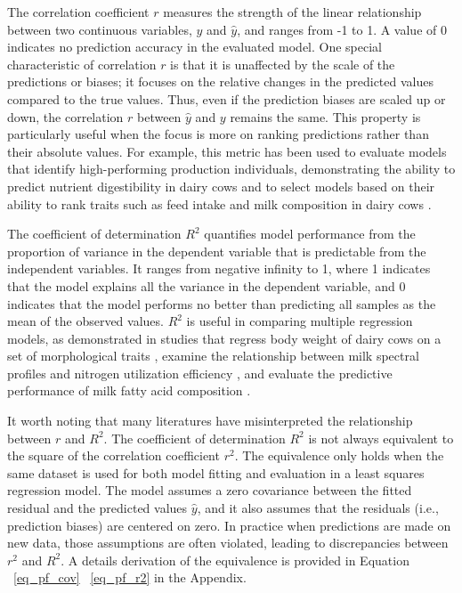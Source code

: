 The correlation coefficient \(r\) measures the strength of the linear relationship between two continuous variables, \(y\) and \(\hat{y}\), and ranges from -1 to 1. A value of 0 indicates no prediction accuracy in the evaluated model. One special characteristic of correlation \(r\) is that it is unaffected by the scale of the predictions or biases; it focuses on the relative changes in the predicted values compared to the true values. Thus, even if the prediction biases are scaled up or down, the correlation \(r\) between \(\hat{y}\) and \(y\) remains the same. This property is particularly useful when the focus is more on ranking predictions rather than their absolute values. For example, this metric has been used to evaluate models that identify high-performing production individuals, demonstrating the ability to predict nutrient digestibility in dairy cows \citep{de_souza_predicting_2018} and to select models based on their ability to rank traits such as feed intake and milk composition in dairy cows \citep{dorea_mining_2018,rovere_prediction_2021}.

The coefficient of determination \(R^2\) quantifies model performance from the proportion of variance in the dependent variable that is predictable from the independent variables. It ranges from negative infinity to 1, where 1 indicates that the model explains all the variance in the dependent variable, and 0 indicates that the model performs no better than predicting all samples as the mean of the observed values. \(R^2\) is useful in comparing multiple regression models, as demonstrated in studies that regress body weight of dairy cows on a set of morphological traits \citep{xavier_use_2022}, examine the relationship between milk spectral profiles and nitrogen utilization efficiency \citep{grelet_potential_2020}, and evaluate the predictive performance of milk fatty acid composition \citep{mantysaari_body_2019}.

It worth noting that many literatures have misinterpreted the relationship between $r$ and $R^2$. The coefficient of determination $R^2$ is not always equivalent to the square of the correlation coefficient $r^2$. The equivalence only holds when the same dataset is used for both model fitting and evaluation in a least squares regression model. The model assumes a zero covariance between the fitted residual and the predicted values $\hat{y}$, and it also assumes that the residuals (i.e., prediction biases) are centered on zero. In practice when predictions are made on new data, those assumptions are often violated, leading to discrepancies between $r^2$ and $R^2$. A details derivation of the equivalence is provided in Equation ~\ref{eq_pf_cov} ~\ref{eq_pf_r2} in the Appendix.


